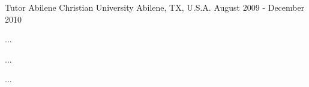 \begin{cventries}
  \cventry
  {Tutor} %
  {Abilene Christian University} %
  {Abilene, TX, U.S.A.} %
  {August 2009 - December 2010} %
  {
    \begin{cvitems} %
      \item {...}
      \item {...}
      \item {...}
    \end{cvitems}
  }

\end{cventries}
